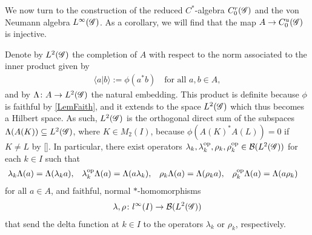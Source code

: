 We now turn to the construction of the reduced $C^{*}$-algebra $C^{r}_{0}(\mathscr{G})$
and the von Neumann algebra $L^{\infty}(\mathscr{G})$. As a corollary, we will find
that the map $A \to C^{u}_{0}(\mathscr{G})$ is injective.

Denote by $L^{2}(\mathscr{G})$ the completion of $A$ with respect to the norm
associated to the inner product given by
\begin{align*}
  \langle a|b\rangle :=\phi(a^{*}b) \quad \text{for all } a,b\in A,
\end{align*}
and by $\Lambda \colon A \to L^{2}(\mathscr{G})$ the natural embedding.  This
product is definite because $\phi$ is faithful by \ref{LemFaith}, and
it extends to the space $L^{2}(\mathscr{G})$ which thus becomes a Hilbert space.
As such, $L^{2}(\mathscr{G})$ is the
orthogonal direct sum of the subspaces
$\Lambda(A(K)) \subseteq L^{2}(\mathscr{G})$, where $K\in M_{2}(I)$, because
$\phi(A(K)^{*}A(L)) = 0$ if $K\neq L$ by \ref{}.  In particular, there
exist  operators
$\lambda_{k},\lambda_{k}^{\operatorname{\mathrm{op}}},\rho_{k},\rho_{k}^{\operatorname{\mathrm{op}}}\in {\cal
  B}(L^{2}(\mathscr{G}))$ for each $k\in I$ such that
\begin{align*}
  \lambda_{k}\Lambda(a)&= \Lambda(\lambda_{k} a), &
  \lambda^{\operatorname{\mathrm{op}}}_{k}\Lambda(a) &= \Lambda(a\lambda_{k}), &
  \rho_{k}\Lambda(a) &= \Lambda(\rho_{k}a), &
  \rho_{k}^{\operatorname{\mathrm{op}}}\Lambda(a) &= \Lambda(a\rho_{k})
\end{align*}
for all $a\in A$, and faithful, normal $*$-homomorphisms
\begin{align} \label{eq:vn-lambda-rho}
  \lambda,\rho \colon l^{\infty}(I) \to
  {\cal B}(L^{2}(\mathscr{G}))
\end{align}
that send the delta function at
$k\in I$ to the operators $\lambda_{k}$ or $\rho_{k}$, respectively. 

